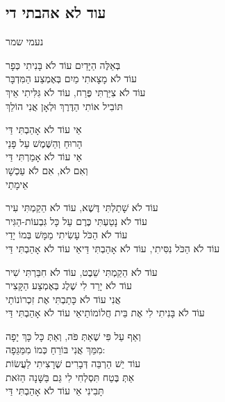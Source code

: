 \documentclass[11pt,twoside]{article}
\newcommand{\instruction}[1]{%
\ifhmode\else\noindent\fi%
{\plain\tiny{#1}}%
}
\begin{document}
{{\newpage

\subsection{עוד לא אהבתי די}
\vspace{-\baselineskip}%
{\centering\instruction{נעמי שמר}\par}
\vfill%
בְּאֵלֶּה הַיָּדַיִם עוֹד לֹא בָּנִיתִי כְּפָר\\
עוֹד לֹא מָצָאתִי מַיִם בְּאֶמְצַע הַמִּדְבָּר\\
עוֹד לֹא צִיַּרְתִּי פֶּרַח, עוֹד לֹא גִּלִּיתִי אֵיךְ\\
תּוֹבִיל אוֹתִי הַדֶּרֶךְ וּלְאָן אֲנִי הוֹלֵךְ

{\large%
אַי \textemdash{} עוֹד לֹא אָהַבְתִּי דַּי\\
הָרוּחַ וְהַשֶּׁמֶשׁ עַל פָּנַי\\
אַי \textemdash{} עוֹד לֹא אָמַרְתִּי דַּי\\
וְאִם לֹא, אִם לֹא עַכְשָׁו\\
אֵימָתַי
}

עוֹד לֹא שָׁתַלְתִּי דֶּשֶׁא, עוֹד לֹא הֵקַמְתִּי עִיר\\
עוֹד לֹא נָטַעְתִּי כֶּרֶם עַל כָּל גִּבְעוֹת-הַגִּיר\\
עוֹד לֹא הַכֹּל עָשִׂיתִי מַמָּשׁ בְּמוֹ יָדַי\\
עוֹד לֹא הַכֹּל נִסִּיתִי, עוֹד לֹא אָהַבְתִּי דַּי\hfill{\scriptsize אַי \textemdash{} עוֹד לֹא אָהַבְתִּי דַּי}

עוֹד לֹא הֵקַמְתִּי שֵׁבֶט, עוֹד לֹא חִבַּרְתִּי שִׁיר\\
עוֹד לֹא יָרַד לִי שֶׁלֶג בְּאֶמְצַע הַקָּצִיר\\
אֲנִי עוֹד לֹא כָּתַבְתִּי אֶת זִכְרוֹנוֹתַי\\
עוֹד לֹא בָּנִיתִי לִי אֶת בֵּית חֲלוֹמוֹתַי\hfill{\scriptsize אַי \textemdash{} עוֹד לֹא אָהַבְתִּי דַּי}

וְאַף עַל פִּי שֶׁאַתְּ פֹּה, וְאַתְּ כָּל כָּךְ יָפָה\\
מִמֵּךְ אֲנִי בּוֹרֵחַ כְּמוֹ מִמַּגֵּפָה:\\
עוֹד יֵשׁ הַרְבֵּה דְּבָרִים שֶׁרָצִיתִי לַעֲשׂוֹת \textemdash{}\\
אַתְּ בֶּטַח תִּסְלְחִי לִי גַּם בַּשָּׁנָה הַזֹּאת\\
\textemdash{} תָּבִינִי \textemdash{}\hfill{\scriptsize אַי \textemdash{} עוֹד לֹא אָהַבְתִּי דַּי}

}}
\end{document}
